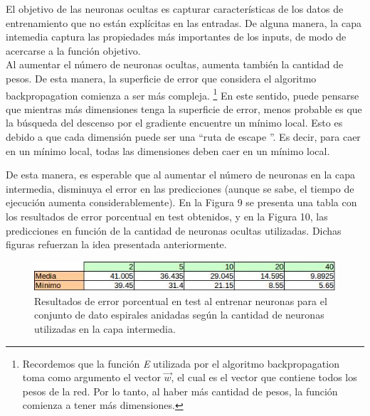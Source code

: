 \documentclass[12pt, a4paper]{article}
\begin{document}
El objetivo de las neuronas ocultas es capturar características de los datos de entrenamiento que no están explícitas en las entradas. De alguna manera, la capa intemedia captura las propiedades más importantes de los inputs, de modo de acercarse a la función objetivo.\\ 
Al aumentar el número de neuronas ocultas, aumenta también la cantidad de pesos. De esta manera, la superficie de error que considera el algoritmo backpropagation comienza a ser más compleja. \footnote{Recordemos que la función \textit{E} utilizada por el algoritmo backpropagation toma como argumento el vector $\vec{w}$, el cual es el vector que contiene todos los pesos de la red. Por lo tanto, al haber más cantidad de pesos, la función comienza a tener más dimensiones.} En este sentido, puede pensarse que mientras más dimensiones tenga la superficie de error, menos probable es que la búsqueda del descenso por el gradiente encuentre un mínimo local. Esto es debido a que cada dimensión puede ser una \textquotedblleft ruta de escape \textquotedblright. Es decir, para caer en un mínimo local, todas las dimensiones deben caer en un mínimo local.

\bigskip

De esta manera, es esperable que al aumentar el número de neuronas en la capa intermedia, disminuya el error en las predicciones (aunque se sabe, el tiempo de ejecución aumenta considerablemente). En la Figura 9 se presenta una tabla con los resultados de error porcentual en test obtenidos, y en la Figura 10, las predicciones en función de la cantidad de neuronas ocultas utilizadas. Dichas figuras refuerzan la idea presentada anteriormente.


\begin{figure}
    \centering
	\includegraphics[scale=1]{tablaB}
	\caption{Resultados de error porcentual en test al entrenar neuronas para el conjunto de dato espirales anidadas según la cantidad de neuronas utilizadas en la capa intermedia.}
\end{figure}
 
\bigskip
\end{document}
